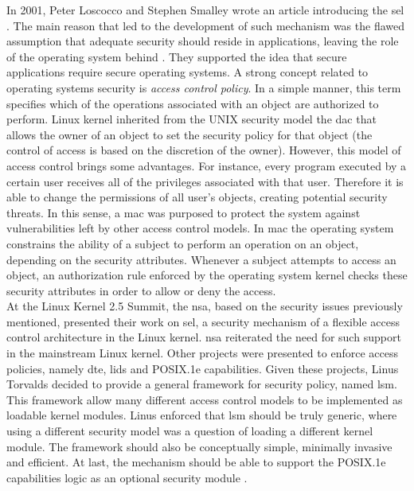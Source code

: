In 2001, Peter Loscocco and Stephen Smalley wrote an article introducing the \gls{sel} \cite{LS01}. The main reason that led to the development of such mechanism was the flawed assumption that adequate security should reside in applications, leaving the role of the operating system behind \cite{LSMTTF98}. They supported the idea that secure applications require secure operating systems. A strong concept related to operating systems security is \textit{access control policy}. In a simple manner, this term specifies which of the operations associated with an object are authorized to perform. Linux kernel inherited from the UNIX security model the \gls{dac} that allows the owner of an object to set the security policy for that object (the control of access is based on the discretion of the owner). However, this model of access control brings some advantages. For instance, every program executed by a certain user receives all of the privileges associated with that user. Therefore it is able to change the permissions of all user's objects, creating potential security threats. In this sense, a \gls{mac} was purposed to protect the system against vulnerabilities left by other access control models. In \gls{mac} the operating system constrains the ability of a subject to perform an operation on an object, depending on the security attributes. Whenever a subject attempts to access an object, an authorization rule enforced by the operating system kernel checks these security attributes in order to allow or deny the access.\\

\noindent
At the Linux Kernel 2.5 Summit, the \gls{nsa}, based on the security issues previously mentioned, presented their work on \gls{sel}, a security mechanism of a flexible access control architecture in the Linux kernel. \gls{nsa} reiterated the need for such support in the mainstream Linux kernel. Other projects were presented to enforce access policies, namely \gls{dte}, \gls{lids} and POSIX.1e capabilities. Given these projects, Linus Torvalds decided to provide a general framework for security policy, named \gls{lsm}. This framework allow many different access control models to be implemented as loadable kernel modules. Linus enforced that \gls{lsm} should be truly generic, where using a different security model was a question of loading a different kernel module. The framework should also be conceptually simple, minimally invasive and efficient. At last, the mechanism should be able to support the POSIX.1e capabilities logic as an optional security module \cite{WCSMK02}.\\

